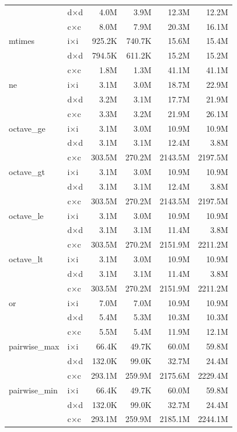 \begin{longtable}{l l r r r r}
   & d×d & 4.0M & 3.9M & 12.3M & 12.2M \\
   & c×c & 8.0M & 7.9M & 20.3M & 16.1M \\
\midrule
  mtimes & i×i & 925.2K & 740.7K & 15.6M & 15.4M \\
   & d×d & 794.5K & 611.2K & 15.2M & 15.2M \\
   & c×c & 1.8M & 1.3M & 41.1M & 41.1M \\
\midrule
  ne & i×i & 3.1M & 3.0M & 18.7M & 22.9M \\
   & d×d & 3.2M & 3.1M & 17.7M & 21.9M \\
   & c×c & 3.3M & 3.2M & 21.9M & 26.1M \\
\midrule
  octave\_ge & i×i & 3.1M & 3.0M & 10.9M & 10.9M \\
   & d×d & 3.1M & 3.1M & 12.4M & 3.8M \\
   & c×c & 303.5M & 270.2M & 2143.5M & 2197.5M \\
\midrule
  octave\_gt & i×i & 3.1M & 3.0M & 10.9M & 10.9M \\
   & d×d & 3.1M & 3.1M & 12.4M & 3.8M \\
   & c×c & 303.5M & 270.2M & 2143.5M & 2197.5M \\
\midrule
  octave\_le & i×i & 3.1M & 3.0M & 10.9M & 10.9M \\
   & d×d & 3.1M & 3.1M & 11.4M & 3.8M \\
   & c×c & 303.5M & 270.2M & 2151.9M & 2211.2M \\
\midrule
  octave\_lt & i×i & 3.1M & 3.0M & 10.9M & 10.9M \\
   & d×d & 3.1M & 3.1M & 11.4M & 3.8M \\
   & c×c & 303.5M & 270.2M & 2151.9M & 2211.2M \\
\midrule
  or & i×i & 7.0M & 7.0M & 10.9M & 10.9M \\
   & d×d & 5.4M & 5.3M & 10.3M & 10.3M \\
   & c×c & 5.5M & 5.4M & 11.9M & 12.1M \\
\midrule
  pairwise\_max & i×i & 66.4K & 49.7K & 60.0M & 59.8M \\
   & d×d & 132.0K & 99.0K & 32.7M & 24.4M \\
   & c×c & 293.1M & 259.9M & 2175.6M & 2229.4M \\
\midrule
  pairwise\_min & i×i & 66.4K & 49.7K & 60.0M & 59.8M \\
   & d×d & 132.0K & 99.0K & 32.7M & 24.4M \\
   & c×c & 293.1M & 259.9M & 2185.1M & 2244.1M \\
\midrule

\end{longtable}
